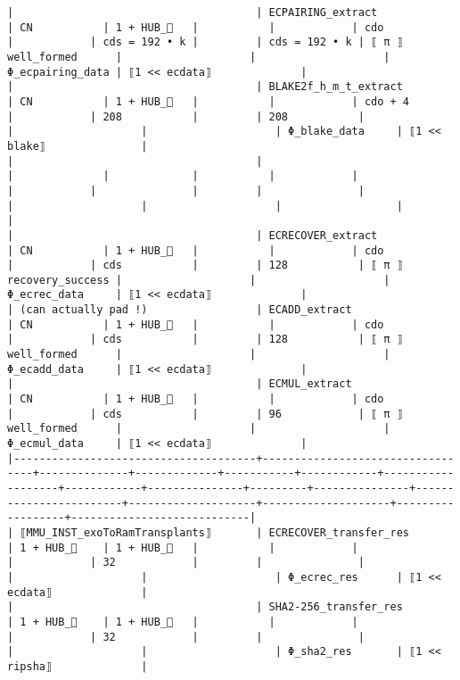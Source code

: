 \documentclass[varwidth=\maxdimen,margin=0.5cm,multi={verbatim}]{standalone}
\begin{document}
\begin{verbatim}
|                                      | ECPAIRING_extract                | CN           | 1 + HUB_   |           |            | cdo               |            | cds = 192 • k |         | cds = 192 • k | ⟦ π ⟧ well_formed      |                    |                    | Φ_ecpairing_data | ⟦1 << ecdata⟧              |
|                                      | BLAKE2f_h_m_t_extract            | CN           | 1 + HUB_   |           |            | cdo + 4           |            | 208           |         | 208           |                        |                    |                    | Φ_blake_data     | ⟦1 << blake⟧               |
|                                      |                                  |              |             |           |            |                   |            |               |         |               |                        |                    |                    |                  |                            |
|                                      | ECRECOVER_extract                | CN           | 1 + HUB_   |           |            | cdo               |            | cds           |         | 128           | ⟦ π ⟧ recovery_success |                    |                    | Φ_ecrec_data     | ⟦1 << ecdata⟧              |
| (can actually pad !)                 | ECADD_extract                    | CN           | 1 + HUB_   |           |            | cdo               |            | cds           |         | 128           | ⟦ π ⟧ well_formed      |                    |                    | Φ_ecadd_data     | ⟦1 << ecdata⟧              |
|                                      | ECMUL_extract                    | CN           | 1 + HUB_   |           |            | cdo               |            | cds           |         | 96            | ⟦ π ⟧ well_formed      |                    |                    | Φ_ecmul_data     | ⟦1 << ecdata⟧              |
|--------------------------------------+----------------------------------+--------------+-------------+-----------+------------+-------------------+------------+---------------+---------+---------------+------------------------+--------------------+--------------------+------------------+----------------------------|
| ⟦MMU_INST_exoToRamTransplants⟧       | ECRECOVER_transfer_res           | 1 + HUB_    | 1 + HUB_   |           |            |                   |            | 32            |         |               |                        |                    |                    | Φ_ecrec_res      | ⟦1 << ecdata⟧              |
|                                      | SHA2-256_transfer_res            | 1 + HUB_    | 1 + HUB_   |           |            |                   |            | 32            |         |               |                        |                    |                    | Φ_sha2_res       | ⟦1 << ripsha⟧              |

\end{verbatim}
\end{document}

